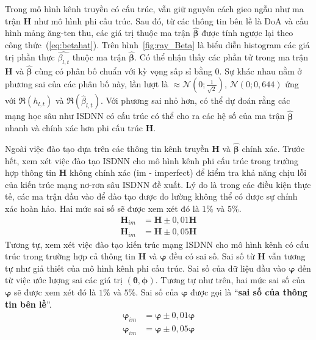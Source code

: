 Trong mô hình kênh truyền có cấu trúc, vẫn giữ nguyên cách gieo ngẫu như ma trận $\mathbf{H}$ như mô hình phi cấu trúc. Sau đó, từ các thông tin bên lề là DoA và cấu hình mảng ăng-ten thu, các giá trị thuộc ma trận $\hat{\boldsymbol{\beta}}$ được tính ngược lại theo công thức~(\ref{eq:betahat}). Trên hình~\ref{fig:ray_Beta} là biểu diễn histogram các giá trị phần thực $\hat{\beta_{l, t}}$ thuộc ma trận $\hat{\boldsymbol{\beta}}$. Có thể nhận thấy các phần tử trong ma trận $\mathbf{H}$ và $\hat{\boldsymbol{\beta}}$ cùng có phân bố chuẩn với kỳ vọng sấp sỉ bằng $0$. Sự khác nhau nằm ở phương sai của các phân bố này, lần lượt là $\approx \mathcal{N} (0; \frac{1}{\sqrt{2}})$, $\mathcal{N} (0; 0,644)$ ứng với $\Re(h_{l, t})$ và $\Re(\hat{\beta}_{l, t})$. Với phương sai nhỏ hơn, có thể dự đoán rằng các mạng học sâu như ISDNN có cấu trúc có thể cho ra các hệ số của ma trận $\hat{\boldsymbol{\beta}}$ nhanh và chính xác hơn phi cấu trúc $\mathbf{H}$.

Ngoài việc đào tạo dựa trên các thông tin kênh truyền $\mathbf{H}$ và $\hat{\boldsymbol{\beta}}$ chính xác. Trước hết, xem xét việc đào tạo ISDNN cho mô hình kênh phi cấu trúc trong trường hợp thông tin $\mathbf{H}$ không chính xác (im - imperfect) để kiểm tra khả năng chịu lỗi của kiến trúc mạng nơ-rơn sâu ISDNN đề xuất. Lý do là trong các điều kiện thực tế, các ma trận đầu vào để đào tạo được đo lường không thể có được sự chính xác hoàn hảo. Hai mức sai số sẽ được xem xét đó là $1\%$ và $5\%$.
\begin{equation}
\begin{aligned}
     \mathbf{H}_{im} &= \mathbf{H} \pm 0,01\mathbf{H} \\
     \mathbf{H}_{im} &= \mathbf{H} \pm 0,05\mathbf{H}
\end{aligned}
\end{equation}
Tương tự, xem xét việc đào tạo kiến trúc mạng ISDNN cho mô hình kênh có cấu trúc trong trường hợp cả thông tin $\mathbf{H}$ và ${\boldsymbol{\varphi}}$ đều có sai số. Sai số từ $\mathbf{H}$ vẫn tương tự như giả thiết của mô hình kênh phi cấu trúc. Sai số của dữ liệu đầu vào ${\boldsymbol{\varphi}}$ đến từ việc ước lượng sai các giá trị $(\boldsymbol{\theta}, \boldsymbol{\phi})$. Tương tự như trên, hai mức sai số của ${\boldsymbol{\varphi}}$ sẽ được xem xét đó là $1\%$ và $5\%$. Sai số của ${\boldsymbol{\varphi}}$ được gọi là ``\textbf{sai số của thông tin bên lề}''.
\begin{equation}
    \begin{aligned}
         {\boldsymbol{\varphi}}_{im} &= {\boldsymbol{\varphi}} \pm 0,01{\boldsymbol{\varphi}} \\
         {\boldsymbol{\varphi}}_{im} &= {\boldsymbol{\varphi}} \pm 0,05{\boldsymbol{\varphi}}
    \end{aligned}
\end{equation}

